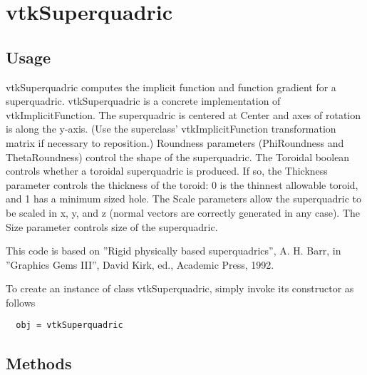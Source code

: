 \section{vtkSuperquadric}

\subsection{Usage}

 vtkSuperquadric computes the implicit function and function gradient
 for a superquadric. vtkSuperquadric is a concrete implementation of
 vtkImplicitFunction.  The superquadric is centered at Center and axes
 of rotation is along the y-axis. (Use the superclass'
 vtkImplicitFunction transformation matrix if necessary to reposition.)
 Roundness parameters (PhiRoundness and ThetaRoundness) control
 the shape of the superquadric.  The Toroidal boolean controls whether
 a toroidal superquadric is produced.  If so, the Thickness parameter
 controls the thickness of the toroid:  0 is the thinnest allowable
 toroid, and 1 has a minimum sized hole.  The Scale parameters allow 
 the superquadric to be scaled in x, y, and z (normal vectors are correctly
 generated in any case).  The Size parameter controls size of the 
 superquadric.

 This code is based on ''Rigid physically based superquadrics'', A. H. Barr,
 in ''Graphics Gems III'', David Kirk, ed., Academic Press, 1992.


To create an instance of class vtkSuperquadric, simply
invoke its constructor as follows
\begin{verbatim}
  obj = vtkSuperquadric
\end{verbatim}
\subsection{Methods}

